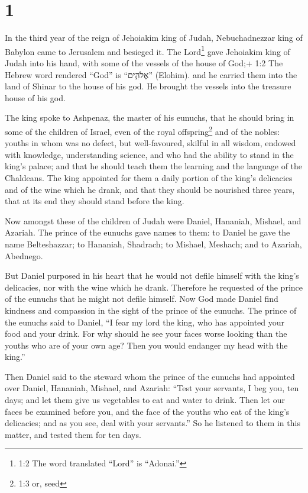 \hypertarget{section}{%
\section{1}\label{section}}

 In the third year of the reign of Jehoiakim king of Judah,
Nebuchadnezzar king of Babylon came to Jerusalem and besieged it.
 The Lord\footnote{1:2 The word translated ``Lord'' is
  ``Adonai.''} gave Jehoiakim king of Judah into his hand, with some of
the vessels of the house of God;+ 1:2 The Hebrew word rendered ``God''
is ``אֱלֹהִ֑ים'' (Elohim). and he carried them into the land of Shinar
to the house of his god. He brought the vessels into the treasure house
of his god.

 The king spoke to Ashpenaz, the master of his eunuchs, that
he should bring in some of the children of Israel, even of the royal
offspring\footnote{1:3 or, seed} and of the nobles:  youths
in whom was no defect, but well-favoured, skilful in all wisdom, endowed
with knowledge, understanding science, and who had the ability to stand
in the king's palace; and that he should teach them the learning and the
language of the Chaldeans.  The king appointed for them a
daily portion of the king's delicacies and of the wine which he drank,
and that they should be nourished three years, that at its end they
should stand before the king.

 Now amongst these of the children of Judah were Daniel,
Hananiah, Mishael, and Azariah.  The prince of the eunuchs
gave names to them: to Daniel he gave the name Belteshazzar; to
Hananiah, Shadrach; to Mishael, Meshach; and to Azariah, Abednego.

 But Daniel purposed in his heart that he would not defile
himself with the king's delicacies, nor with the wine which he drank.
Therefore he requested of the prince of the eunuchs that he might not
defile himself.  Now God made Daniel find kindness and
compassion in the sight of the prince of the eunuchs.  The
prince of the eunuchs said to Daniel, ``I fear my lord the king, who has
appointed your food and your drink. For why should he see your faces
worse looking than the youths who are of your own age? Then you would
endanger my head with the king.''

 Then Daniel said to the steward whom the prince of the
eunuchs had appointed over Daniel, Hananiah, Mishael, and Azariah:
 ``Test your servants, I beg you, ten days; and let them
give us vegetables to eat and water to drink.  Then let our
faces be examined before you, and the face of the youths who eat of the
king's delicacies; and as you see, deal with your servants.''
 So he listened to them in this matter, and tested them for
ten days.

